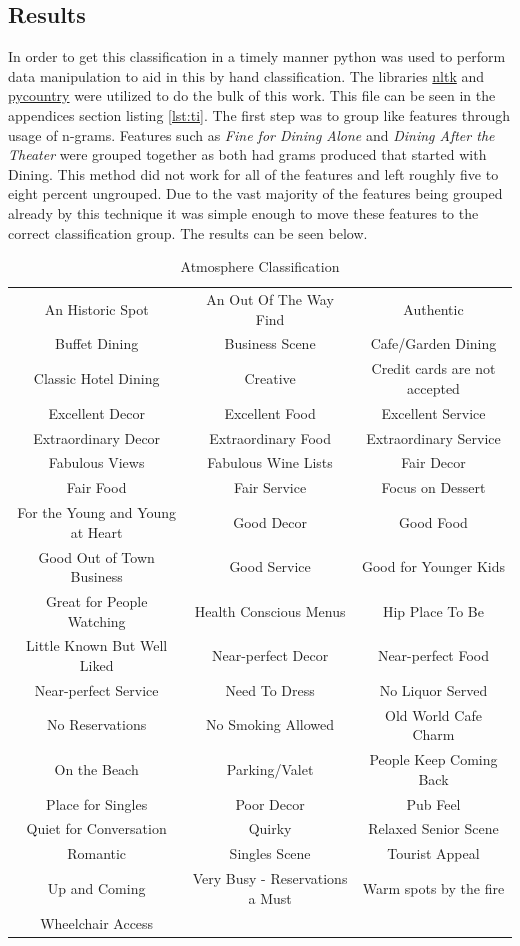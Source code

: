 \documentclass[letterpaper,10pt]{article}
\begin{document}
\subsection*{Results}

In order to get this classification in a timely manner python was used to perform data manipulation to aid in this by hand classification. The libraries \href{http://www.nltk.org}{nltk} and \href{https://pypi.python.org/pypi/pycountry}{pycountry} were utilized to do the bulk of this work. This file can be seen in the appendices section listing \hyperref[lst:ti]{\ref{lst:ti}}. The first step was to group like features through usage of n-grams. Features such as \textit{Fine for Dining Alone} and \textit{Dining After the Theater} were grouped together as both had grams produced that started with Dining. This method did not work for all of the features and left roughly five to eight percent ungrouped. Due to the vast majority of the features being grouped already by this technique it was simple enough to move these features to the correct classification group.  The results can be seen below.

\begin{table}[h]
\centering
\caption{Atmosphere Classification}
\begin{tabu}{ccc} 
An Historic Spot & An Out Of The Way Find & Authentic \\
Buffet Dining & Business Scene & Cafe/Garden Dining \\
Classic Hotel Dining & Creative & Credit cards are not accepted \\
Excellent Decor & Excellent Food & Excellent Service \\
Extraordinary Decor & Extraordinary Food & Extraordinary Service \\
Fabulous Views & Fabulous Wine Lists & Fair Decor \\
Fair Food & Fair Service & Focus on Dessert \\
For the Young and Young at Heart & Good Decor & Good Food \\
Good Out of Town Business & Good Service & Good for Younger Kids \\
Great for People Watching & Health Conscious Menus & Hip Place To Be \\
Little Known But Well Liked & Near-perfect Decor & Near-perfect Food \\
Near-perfect Service & Need To Dress & No Liquor Served \\
No Reservations & No Smoking Allowed & Old World Cafe Charm \\
On the Beach & Parking/Valet & People Keep Coming Back \\
Place for Singles & Poor Decor & Pub Feel \\
Quiet for Conversation & Quirky & Relaxed Senior Scene \\
Romantic & Singles Scene & Tourist Appeal \\
Up and Coming & Very Busy - Reservations a Must & Warm spots by the fire \\
Wheelchair Access & & \\
\end{tabu}
\end{table}
\end{document}
